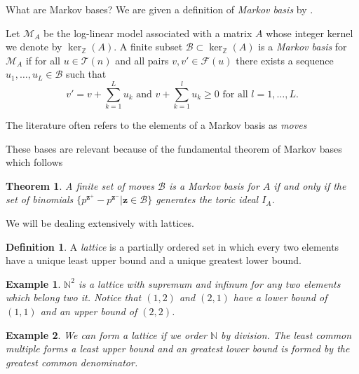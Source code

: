\documentclass[11pt]{amsart}
\theoremstyle{plain}
\newtheorem{thm}{Theorem}
\newtheorem{fact}{Fact}
\newtheorem{exa}{Example}
\theoremstyle{definition}
\newtheorem{defi}{Definition}
\begin{document}
What are Markov bases? We are given a definition of \emph{Markov basis} by \cite{bernd}.

Let $\mathcal{M}_A$ be the log-linear model associated with a matrix $A$ whose integer kernel we denote by $\ker_\mathbb{Z}(A)$.
A finite subset $\mathcal{B}\subset\ker_{\mathbb{Z}}(A)$ is a \emph{Markov basis} for $\mathcal{M}_A$ if for all $u\in \mathcal{T}(n)$ and all pairs $v,v'\in \mathcal{F}(u)$ there exists a sequence $u_1,\dots,u_L\in  \mathcal{B}$ such that
\[v'=v+\sum\limits_{k=1}^L{u_k}\text{ and }v+\sum\limits_{k=1}^l{u_k}\ge 0\text{ for all }l=1,\dots,L.\]

The literature often refers to the elements of a Markov basis as \emph{moves}\cite[p.16]{bernd}

These bases are relevant because of the fundamental theorem of Markov bases which follows
\begin{thm}
\cite[p.~54]{aoki}
A finite set of moves $\mathcal{B}$ is a Markov basis for $A$ if and only if the set of binomials $\{p^{\mathbf{z}^+}-p^{\mathbf{z}^-}|\mathbf{z}\in \mathcal{B}\}$ generates the toric ideal $I_A$.
\end{thm}

We will be dealing extensively with lattices.
\begin{defi}
\cite{stanley}
A \emph{lattice} is a partially ordered set in which every two elements have a unique least upper bound and a unique greatest lower bound.
\end{defi}
\begin{exa}
$\mathbb{N}^2$ is a lattice with supremum and infinum for any two elements which belong two it. Notice that $(1,2)$ and $(2,1)$ have a lower bound of $(1,1)$ and an upper bound of $(2,2)$.
\end{exa}
\begin{exa}
We can form a lattice if we order $\mathbb{N}$ by division. The least common multiple forms a least upper bound and an greatest lower bound is formed by the greatest common denominator.
\end{exa}


\end{document}
